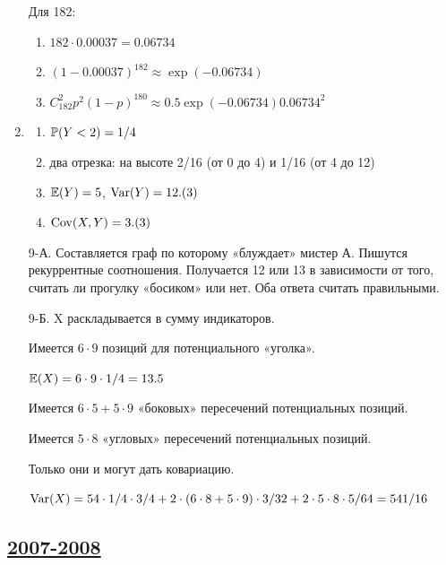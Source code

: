 \begin{enumerate}
Для 182:
\begin{enumerate}
\item $182 \cdot 0.00037 = 0.06734$
\item $(1 - 0.00037)^182 \approx \exp(-0.06734)$
\item $C_{182}^{2}p^{2}(1-p)^{180} \approx 0.5 \exp(-0.06734)0.06734^2$
\end{enumerate}
\item
\begin{enumerate}
\item $\P(Y < 2) = 1/4$
\item два отрезка: на высоте 2/16 (от 0 до 4) и 1/16 (от 4 до 12)
\item $\E(Y) = 5$, $\Var(Y) = 12.(3)$
\item $\Cov(X, Y) = 3.(3)$
\end{enumerate}
\item[9-А.] Составляется граф по которому «блуждает» мистер А. Пишутся рекуррентные
соотношения. Получается 12 или 13 в зависимости от того, считать ли прогулку
«босиком» или нет. Оба ответа считать правильными.
\item[9-Б.] X раскладывается в сумму индикаторов.

Имеется $6 \cdot 9$ позиций для потенциального «уголка».

$\E(X) = 6 \cdot 9 \cdot 1/4 = 13.5$

Имеется $6 \cdot 5 + 5 \cdot 9$ «боковых» пересечений потенциальных позиций.

Имеется $5 \cdot 8$ «угловых» пересечений потенциальных позиций.

Только они и могут дать ковариацию.

$\Var(X) = 54 \cdot 1/4 \cdot 3/4 + 2 \cdot(6 \cdot 8 + 5 \cdot 9) \cdot 3/32 +
2 \cdot 5 \cdot 8 \cdot 5/64 = 541/16$
\end{enumerate}



\subsection[2007-2008]{\hyperref[sec:kr_01_2007_2008]{2007-2008}}
\label{sec:sol_kr_01_2007_2008}

